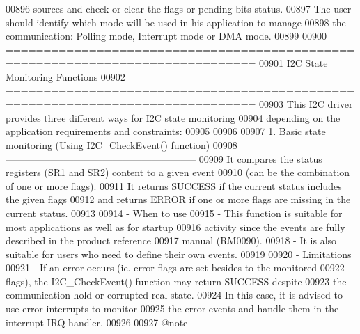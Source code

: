 \begin{DoxyCode}
00896 \textcolor{comment}{  sources and check or clear the flags or pending bits status.}
00897 \textcolor{comment}{  The user should identify which mode will be used in his application to manage }
00898 \textcolor{comment}{  the communication: Polling mode, Interrupt mode or DMA mode. }
00899 \textcolor{comment}{}
00900 \textcolor{comment}{ ===============================================================================}
00901 \textcolor{comment}{                          I2C State Monitoring Functions                    }
00902 \textcolor{comment}{ ===============================================================================   }
00903 \textcolor{comment}{  This I2C driver provides three different ways for I2C state monitoring}
00904 \textcolor{comment}{  depending on the application requirements and constraints:}
00905 \textcolor{comment}{         }
00906 \textcolor{comment}{   }
00907 \textcolor{comment}{     1. Basic state monitoring (Using I2C\_CheckEvent() function)}
00908 \textcolor{comment}{     -----------------------------------------------------------}
00909 \textcolor{comment}{        It compares the status registers (SR1 and SR2) content to a given event}
00910 \textcolor{comment}{        (can be the combination of one or more flags).}
00911 \textcolor{comment}{        It returns SUCCESS if the current status includes the given flags }
00912 \textcolor{comment}{        and returns ERROR if one or more flags are missing in the current status.}
00913 \textcolor{comment}{}
00914 \textcolor{comment}{          - When to use}
00915 \textcolor{comment}{             - This function is suitable for most applications as well as for startup }
00916 \textcolor{comment}{               activity since the events are fully described in the product reference }
00917 \textcolor{comment}{               manual (RM0090).}
00918 \textcolor{comment}{             - It is also suitable for users who need to define their own events.}
00919 \textcolor{comment}{}
00920 \textcolor{comment}{          - Limitations}
00921 \textcolor{comment}{             - If an error occurs (ie. error flags are set besides to the monitored }
00922 \textcolor{comment}{               flags), the I2C\_CheckEvent() function may return SUCCESS despite }
00923 \textcolor{comment}{               the communication hold or corrupted real state. }
00924 \textcolor{comment}{               In this case, it is advised to use error interrupts to monitor }
00925 \textcolor{comment}{               the error events and handle them in the interrupt IRQ handler.}
00926 \textcolor{comment}{         }
00927 \textcolor{comment}{     @note }

\end{DoxyCode}
